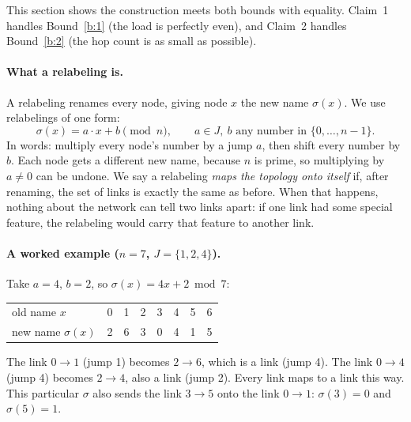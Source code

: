 \documentclass[11pt]{article}
\theoremstyle{definition}
\begin{document}
This section shows the construction meets both bounds with equality. Claim~1 handles Bound~\ref{b:1} (the load is
perfectly even), and Claim~2 handles Bound~\ref{b:2} (the hop count is as small as possible).

\paragraph{What a relabeling is.} A relabeling renames every node, giving node $x$ the new name $\sigma(x)$. We use
relabelings of one form:
\[
\sigma(x) = a\cdot x + b \pmod n, \qquad a \in J,\ b \text{ any number in } \{0,\dots,n-1\}.
\]
In words: multiply every node's number by a jump $a$, then shift every number by $b$. Each node gets a different new
name, because $n$ is prime, so multiplying by $a \ne 0$ can be undone. We say a relabeling \emph{maps the topology
onto itself} if, after renaming, the set of links is exactly the same as before. When that happens, nothing about the
network can tell two links apart: if one link had some special feature, the relabeling would carry that feature to
another link.

\paragraph{A worked example ($n=7$, $J=\{1,2,4\}$).} Take $a=4$, $b=2$, so $\sigma(x) = 4x+2 \bmod 7$:
\begin{center}
\begin{tabular}{l|ccccccc}
old name $x$ & 0 & 1 & 2 & 3 & 4 & 5 & 6 \\
new name $\sigma(x)$ & 2 & 6 & 3 & 0 & 4 & 1 & 5
\end{tabular}
\end{center}
The link $0\to1$ (jump 1) becomes $2\to6$, which is a link (jump 4). The link $0\to4$ (jump 4) becomes $2\to4$, also a
link (jump 2). Every link maps to a link this way. This particular $\sigma$ also sends the link $3\to5$ onto the link
$0\to1$: $\sigma(3)=0$ and $\sigma(5)=1$.
\end{document}

